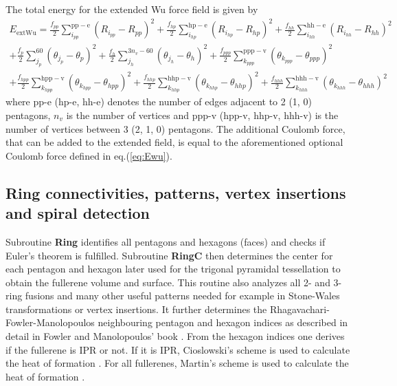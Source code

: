 \documentclass[article,a4paper,twoside]{memoir}
\let\acr=\textsmaller
\newcommand{\funname}[1]{{\color{blue}\textbf{#1}}}
\begin{document}
The total energy for the extended Wu force field is given by
\begin{multline}
  \label{eq:extEwu}
  E_{\mathrm{extWu}} =
          \frac{f_{pp}}{2}  \sum_{i_{pp}}^{\mathrm{pp-e}} \left(R_{i_{pp}} - R_{pp}\right)^2 
        + \frac{f_{hp}}{2}  \sum_{i_{hp}}^{\mathrm{hp-e}} \left(R_{i_{hp}} - R_{hp}\right)^2 
        + \frac{f_{hh}}{2}  \sum_{i_{hh}}^{\mathrm{hh-e}} \left(R_{i_{hh}} - R_{hh}\right)^2\\
        + \frac{f_p}{2}     \sum_{j_p}^{60} \left(\theta_{j_p} - \theta_p\right)^2 
        + \frac{f_h}{2}     \sum_{j_h}^{3n_v-60} \left(\theta_{j_h} - \theta_h\right)^2 
        + \frac{f_{ppp}}{2} \sum_{k_{ppp}}^{\mathrm{ppp-v}} \left(\theta_{k_{ppp}} - \theta_{ppp}\right)^2 \\
        + \frac{f_{hpp}}{2} \sum_{k_{hpp}}^{\mathrm{hpp-v}} \left(\theta_{k_{hpp}} - \theta_{hpp}\right)^2 
        + \frac{f_{hhp}}{2} \sum_{k_{hhp}}^{\mathrm{hhp-v}} \left(\theta_{k_{hhp}} - \theta_{hhp}\right)^2 
        + \frac{f_{hhh}}{2} \sum_{k_{hhh}}^{\mathrm{hhh-v}} \left(\theta_{k_{hhh}} - \theta_{hhh}\right)^2
\end{multline}
where pp-e (hp-e, hh-e) denotes the number of edges adjacent to 2 (1, 0) pentagons, $n_v$ is the 
number of vertices and ppp-v (hpp-v, hhp-v, hhh-v) is the number of vertices between 3 (2, 1, 0) pentagons.
The additional Coulomb force, that can be added to the extended \acr{HOFF} field, is equal to the aforementioned
optional Coulomb force defined in eq.(\ref{eq:Ewu}).

\subsection{Ring connectivities, patterns, vertex insertions and spiral detection}
Subroutine \funname{Ring} identifies all pentagons and hexagons (faces) and checks if Euler's theorem is fulfilled.
Subroutine \funname{RingC} then determines the center for each pentagon and hexagon later used for the trigonal pyramidal tessellation to obtain
the fullerene volume and surface. This routine also analyzes all 2- and 3-ring fusions and many other useful patterns needed for example
in Stone-Wales transformations or vertex insertions. It further determines the Rhagavachari-Fowler-Manolopoulos neighbouring pentagon 
and hexagon indices as described in detail in Fowler and Manolopoulos' book \cite{Atlas}.
From the hexagon indices one derives if the fullerene is IPR or not. If it is IPR, Cioslowski's scheme is used to calculate the 
heat of formation \cite{Cioslowski2000}. For all fullerenes, Martin's scheme is used to calculate the heat of formation \cite{Alcami}.
\end{document}
